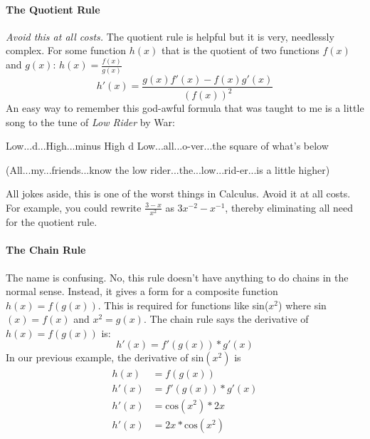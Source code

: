 \documentclass[../revisedmain.tex]{subfiles}
\begin{document}
\paragraph{The Quotient Rule} \textit{Avoid this at all costs.} The quotient rule is helpful but it is very, needlessly complex. For some function $h(x)$ that is the quotient of two functions $f(x)$ and $g(x)$: $h(x)=\displaystyle\frac{f(x)}{g(x)}$$$h'(x)=\frac{g(x)f'(x)-f(x)g'(x)}{(f(x))^2}$$ An easy way to remember this god-awful formula that was taught to me is a little song to the tune of \textit{Low Rider} by War:
\begin{displayquote}
	Low...d...High...minus High d Low...all...o-ver...the square of what's below 
\end{displayquote}
\begin{displayquote}
	(All...my...friends...know the low rider...the...low...rid-er...is a little higher)
\end{displayquote}
All jokes aside, this is one of the worst things in Calculus. Avoid it at all costs. For example, you could rewrite $\displaystyle\frac{3-x}{x^2}$ as $3x^{-2}-x^{-1}$, thereby eliminating all need for the quotient rule.
\paragraph{The Chain Rule} The name is confusing. No, this rule doesn't have anything to do chains in the normal sense. Instead, it gives a form for a composite function $h(x)=f(g(x))$. This is required for functions like sin($x^2$) where sin$(x)=f(x)$ and $x^2=g(x)$. The chain rule says the derivative of $h(x)=f(g(x))$ is:$$h'(x)=f'(g(x))*g'(x)$$In our previous example, the derivative of sin$(x^2)$ is
\begin{equation}
\begin{split}
h(x) &= f(g(x)) \\
h'(x) &= f'(g(x))*g'(x) \\
h'(x) &= \text{cos}(x^2)*2x \\
h'(x) &= 2x*\text{cos}(x^2)
\end{split}
\end{equation}
\end{document}
